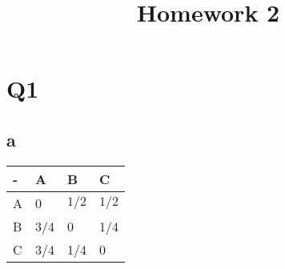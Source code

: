 \documentclass{article}
\title{Homework 2}
\begin{document}
\maketitle
\section*{Q1}
\subsection*{a}
\begin{tabular}{|l|l|l|l|}
\hline
- & A & B & C\\ \hline
A & 0 & $1/2$ & $1/2$\\ \hline
B & 3/4 & 0 & 1/4\\ \hline
C & 3/4 & 1/4 & 0\\ \hline
\end{tabular}
\end{document}
